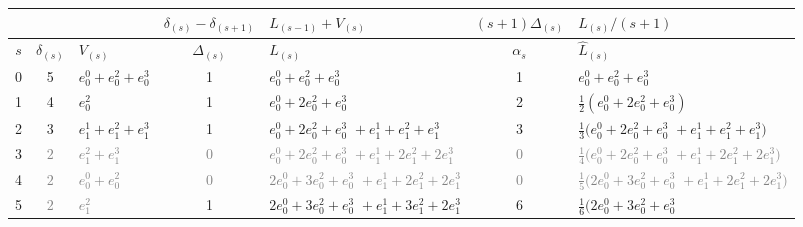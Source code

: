 \documentclass[11pt,a4paper]{article}
\newcommand{\eji}[2]{e^{#1}_{#2}}       %
\begin{document}
\begin{center}
\small
\setlength{\tabcolsep}{4pt}
\renewcommand{\arraystretch}{1.35}
\begin{tabular}{c|cp{3cm}|cp{3cm}|cp{3cm}}
\toprule
    &
    &
    & $\delta_{(s)}-\delta_{(s+1)}$
    & $L_{(s-1)}+V_{(s)}$
    & $(s+1)\Delta_{(s)}$
    & $L_{(s)}/(s+1)$\\
\midrule
$s$ & $\delta_{(s)}$
    & $V_{(s)}$
    & $\Delta_{(s)}$
    & $L_{(s)}$
    & $\alpha_s$
    & ${\hat L}_{(s)}$ \\
\midrule
0 & 5 & $\eji{0}{0}+\eji{2}{0}+\eji{3}{0}$ & 1
  & $\eji{0}{0}+\eji{2}{0}+\eji{3}{0}$
  & 1
  & $\eji{0}{0}+\eji{2}{0}+\eji{3}{0}$
  \\[3pt]
1 & 4 & $\eji{2}{0}$ & 1
  & $\eji{0}{0}+2\eji{2}{0}+\eji{3}{0}$
  & 2
  & $\tfrac 1 2 (\eji{0}{0}+2\eji{2}{0}+\eji{3}{0})$
 \\[3pt]
2 & 3 & $\eji{1}{1}+\eji{2}{1}+\eji{3}{1}$
& 1
  & $\eji{0}{0}+2\eji{2}{0}+\eji{3}{0}$\newline
    ${}+\eji{1}{1}+\eji{2}{1}+\eji{3}{1}$
    & 3
  & $\tfrac 1 3 (\eji{0}{0}+2\eji{2}{0}+\eji{3}{0}$\newline
    ${}+\eji{1}{1}+\eji{2}{1}+\eji{3}{1})$
   \\[3pt]
\rowcolor{gray!15}\cellcolor{white}3 & \textcolor{gray}{$2$} & \textcolor{gray}{$\eji{2}{1}+\eji{3}{1}$} & \textcolor{gray}{$0$}
  & \textcolor{gray}{$\eji{0}{0}+2\eji{2}{0}+\eji{3}{0}$\newline
    ${}+\eji{1}{1}+2\eji{2}{1}+2\eji{3}{1}$}
    & \textcolor{gray}{$0$}
  & \textcolor{gray}{$\tfrac 1 4 (\eji{0}{0}+2\eji{2}{0}+\eji{3}{0}$\newline
    ${}+\eji{1}{1}+2\eji{2}{1}+2\eji{3}{1})$}
   \\[3pt]
\rowcolor{gray!15}\cellcolor{white}4 & \textcolor{gray}{$2$} & \textcolor{gray}{$\eji{0}{0}+\eji{2}{0}$} & \textcolor{gray}{$0$}
  & \textcolor{gray}{$2\eji{0}{0}+3\eji{2}{0}+\eji{3}{0}$\newline
    ${}+\eji{1}{1}+2\eji{2}{1}+2\eji{3}{1}$}
    & \textcolor{gray}{$0$}
  & \textcolor{gray}{$\tfrac 1 5 (2\eji{0}{0}+3\eji{2}{0}+\eji{3}{0}$\newline
    ${}+\eji{1}{1}+2\eji{2}{1}+2\eji{3}{1})$}
    \\[3pt]
5 & \cellcolor{gray!15}\textcolor{gray}{$2$} & \cellcolor{gray!15}\textcolor{gray}{$\eji{2}{1}$} & 1
  & $2\eji{0}{0}+3\eji{2}{0}+\eji{3}{0}$\newline
    ${}+\eji{1}{1}+3\eji{2}{1}+2\eji{3}{1}$
    & 6
  & $\tfrac 1 6 (2\eji{0}{0}+3\eji{2}{0}+\eji{3}{0}$\newline

\end{tabular}
\end{center}
\end{document}
